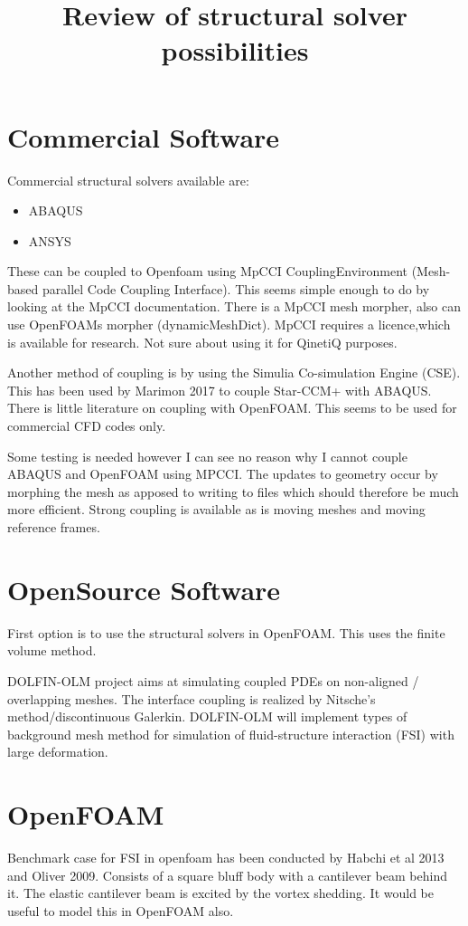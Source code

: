 \documentclass{article}
\title{Review of structural solver possibilities}
\begin{document}
	\maketitle
	\section{Commercial Software}
	Commercial structural solvers available are:
	\begin{itemize}
		\item ABAQUS
		\item ANSYS
	\end{itemize} 

	These can be coupled to Openfoam using MpCCI CouplingEnvironment (Mesh-based parallel Code Coupling Interface). This seems simple enough to do by looking at the MpCCI documentation. There is a MpCCI mesh morpher, also can use OpenFOAMs morpher (dynamicMeshDict). MpCCI requires a licence,which is available for research. Not sure about using it for QinetiQ purposes. 
	
	Another method of coupling is by using the Simulia Co-simulation Engine (CSE). This has been used by Marimon 2017 to couple Star-CCM+ with ABAQUS. There is little literature on coupling with OpenFOAM.	This seems to be used for commercial CFD codes only.
	
	Some testing is needed however I can see no reason why I cannot couple ABAQUS and OpenFOAM using MPCCI. The updates to geometry occur by morphing the mesh as apposed to writing to files which should therefore be much more efficient. Strong coupling is available as is moving meshes and moving reference frames.
	
	\section{OpenSource Software}
	
	First option is to use the structural solvers in OpenFOAM. This uses the finite volume method. 
	
	
	DOLFIN-OLM project aims at simulating coupled PDEs on non-aligned / overlapping meshes.
	The interface coupling is realized by Nitsche's method/discontinuous Galerkin. DOLFIN-OLM will implement types of background mesh method for simulation of fluid-structure interaction (FSI) with large deformation.
	
	
	\section{OpenFOAM}
	
	Benchmark case for FSI in openfoam has been conducted by Habchi et al 2013 and Oliver 2009. Consists of a square bluff body with a cantilever beam behind it. The elastic cantilever beam is excited by the vortex shedding. It would be useful to model this in OpenFOAM also.
\end{document}
